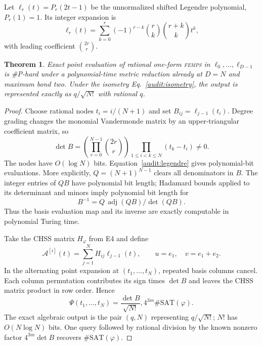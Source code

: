 \documentclass[11pt]{article}
\newtheorem{theorem}{Theorem}[section]
\theoremstyle{definition}
\newcommand{\FEMPS}{\textnormal{\textsc{femps}}}
\begin{document}
Let $\ell_r(t)=P_r(2t-1)$ be the unnormalized shifted Legendre polynomial,
$P_r(1)=1$.  Its integer expansion is
\begin{equation}
\ell_r(t)=\sum_{k=0}^r(-1)^{r-k}\binom rk\binom{r+k}{k}t^k,
\label{audit:legendre}
\end{equation}
with leading coefficient $\binom{2r}{r}$.

\begin{theorem}
Exact point evaluation of rational one-form \FEMPS{} in
$\ell_0,\ldots,\ell_{D-1}$ is \#P-hard under a polynomial-time metric
reduction already at $D=N$ and maximum bond two.  Under the isometry
Eq.~\eqref{audit:isometry}, the output is represented exactly as
$q/\sqrt{N!}$ with rational $q$.
\end{theorem}

\begin{proof}
Choose rational nodes $t_i=i/(N+1)$ and set
$B_{ij}=\ell_{j-1}(t_i)$.  Degree grading changes the monomial Vandermonde
matrix by an upper-triangular coefficient matrix, so
\begin{equation}
\det B=\left(\prod_{r=0}^{N-1}\binom{2r}{r}\right)
\prod_{1\le i<k\le N}(t_k-t_i)\ne0.
\label{audit:Bdet}
\end{equation}
The nodes have $O(\log N)$ bits.  Equation~\eqref{audit:legendre} gives
polynomial-bit evaluations.  More explicitly,
$Q=(N+1)^{N-1}$ clears all denominators in $B$.  The integer entries of $QB$
have polynomial bit length; Hadamard bounds applied to its determinant and
minors imply polynomial bit length for
\begin{equation}
B^{-1}=Q\,\operatorname{adj}(QB)/\det(QB).
\end{equation}
Thus the basis evaluation map and its inverse are exactly computable in
polynomial Turing time.

Take the CHSS matrix $H_\varphi$ from E4 and define
\begin{equation}
\mathcal A^{[i]}(t)=\sum_{j=1}^N H_{ij}\ell_{j-1}(t),
\qquad u=e_1,\quad v=e_1+e_2.
\end{equation}
In the alternating point expansion at $(t_1,\ldots,t_N)$, repeated basis
columns cancel.  Each column permutation contributes its sign times $\det B$
and leaves the CHSS matrix product in row order.  Hence
\begin{equation}
\Psi(t_1,\ldots,t_N)
=\frac{\det B}{\sqrt{N!}},4^{3m}\#\mathrm{SAT}(\varphi).
\label{audit:point}
\end{equation}
The exact algebraic output is the pair $(q,N)$ representing $q/\sqrt{N!}$;
$N!$ has $O(N\log N)$ bits.  One query followed by rational division by the
known nonzero factor $4^{3m}\det B$ recovers $\#\mathrm{SAT}(\varphi)$.
\end{proof}
\end{document}
